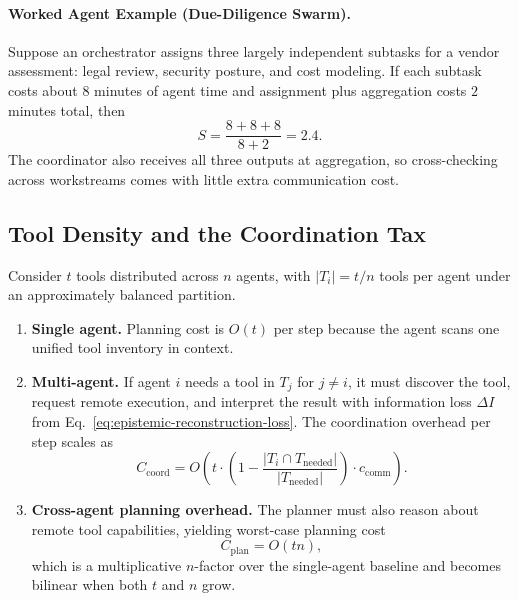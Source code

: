 \paragraph{Worked Agent Example (Due-Diligence Swarm).}
Suppose an orchestrator assigns three largely independent subtasks for a vendor assessment: legal review,
security posture, and cost modeling. If each subtask costs about $8$ minutes of agent time and
assignment plus aggregation costs $2$ minutes total, then
\[
S = \frac{8+8+8}{8+2} = 2.4.
\]
The coordinator also receives all three outputs at aggregation, so cross-checking across workstreams
comes with little extra communication cost.

\subsection{Tool Density and the Coordination Tax}

\begin{definition}
\label{thm:tool-density}
Consider $t$ tools distributed across $n$ agents, with $|T_i| = t/n$ tools per agent under an
approximately balanced partition.
\begin{enumerate}[leftmargin=*]
\item[(a)] \textbf{Single agent.} Planning cost is $O(t)$ per step because the agent scans one unified tool
inventory in context.
\item[(b)] \textbf{Multi-agent.} If agent $i$ needs a tool in $T_j$ for $j \ne i$, it must discover the
tool, request remote execution, and interpret the result with information loss $\Delta I$ from
Eq.~\eqref{eq:epistemic-reconstruction-loss}. The coordination overhead per step scales as
\begin{equation}
C_{\mathrm{coord}} =
O\!\left(t \cdot \left(1 - \frac{|T_i \cap T_{\mathrm{needed}}|}{|T_{\mathrm{needed}}|}\right) \cdot c_{\mathrm{comm}}\right).
\label{eq:tool-coord-overhead}
\end{equation}
\item[(c)] \textbf{Cross-agent planning overhead.} The planner must also reason about remote tool
capabilities, yielding worst-case planning cost
\begin{equation}
C_{\mathrm{plan}} = O(tn),
\label{eq:tool-planning-cost}
\end{equation}
which is a multiplicative $n$-factor over the single-agent baseline and becomes bilinear when both $t$
and $n$ grow.
\end{enumerate}
\end{definition}


